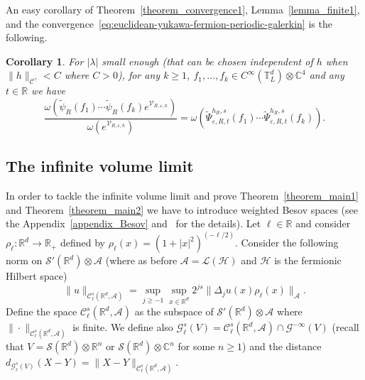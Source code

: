 \documentclass{article}
\newtheorem{corollary}[theorem]{Corollary}
\begin{document}
An easy corollary of Theorem~\ref{theorem_convergence1},
Lemma~\ref{lemma_finite1}, and the
convergence~{\eqref{eq:euclidean-yukawa-fermion-periodic-galerkin}} is the
following.

\begin{corollary}
  \label{corollary_formula}For $| \lambda |$ small enough (that can be chosen
  independent of $h$ when $\| h \|_{\mathcal{C}^{\gamma}} < C$ where $C > 0$),
  for any $k \geqslant 1$, $f_1, \ldots, f_k \in C^{\infty} (\mathbb{T}^d_L)
  \otimes \mathbb{C}^4$ and any $t \in \mathbb{R}$ we have
  \[ \frac{\omega (\tilde{\psi}_R (f_1) \cdots \tilde{\psi}_R (f_k)
     e^{\mathcal{V}_{R, \varepsilon, h}})}{\omega (e^{\mathcal{V}_{R,
     \varepsilon, h}})} = \omega (\tilde{\Psi}_{\varepsilon, R, t}^{h_R, s}
     (f_1) \cdots \tilde{\Psi}_{\varepsilon, R, t}^{h_R, s} (f_k)) . \]
\end{corollary}

\subsection{The infinite volume limit}

In order to tackle the infinite volume limit and prove
Theorem~\ref{theorem_main1} and Theorem~\ref{theorem_main2} we have to
introduce weighted Besov spaces (see the Appendix~\ref{appendix_Besov}
and~{\cite{TriebelIII}} for the details). Let $\ell \in \mathbb{R}$ and
consider $\rho_{\ell} : \mathbb{R}^d \rightarrow \mathbb{R}_+$ defined by
$\rho_{\ell} (x) = (1 + | x |^2)^{(- \ell / 2)}$. Consider the following norm
on $\mathcal{S}' (\mathbb{R}^d) \otimes \mathcal{A}$ (where as before
$\mathcal{A} = \mathcal{L} (\mathcal{H})$ and $\mathcal{H}$ is the fermionic
Hilbert space)
\[ \| u \|_{\mathcal{C}^s_{\ell} (\mathbb{R}^d, \mathcal{A})} = \sup_{j
   \geqslant - 1} \sup_{x \in \mathbb{R}^d} 2^{j s} \| \Delta_j u (x)
   \rho_{\ell} (x) \|_{\mathcal{A}} . \]
Define the space $\mathcal{C}^s_{\ell} (\mathbb{R}^d, \mathcal{A})$ as the
subspace of $\mathcal{S}' (\mathbb{R}^d) \otimes \mathcal{A}$ where $\| \cdot
\|_{\mathcal{C}^s_{\ell} (\mathbb{R}^d, \mathcal{A})}$ is finite. We define
also $\mathcal{G}^s_{\ell} (V) = \mathcal{C}^s_{\ell} (\mathbb{R}^d,
\mathcal{A}) \cap \mathcal{G}^{- \infty} (V)$ (recall that $V =\mathcal{S}
(\mathbb{R}^d) \otimes \mathbb{R}^n$ or $\mathcal{S} (\mathbb{R}^d) \otimes
\mathbb{C}^n$ for some $n \geqslant 1$) and the distance
$d_{\mathcal{G}^s_{\ell} (V)} (X - Y) = \| X - Y \|_{\mathcal{C}^s_{\ell}
(\mathbb{R}^d, \mathcal{A})}$.
\end{document}
